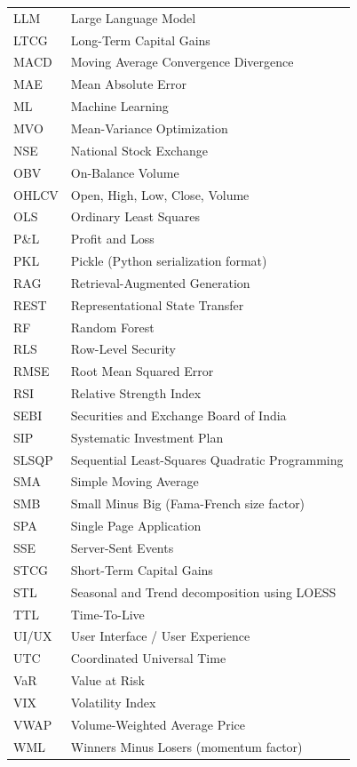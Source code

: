 \documentclass[12pt, a4paper, oneside]{report}
\begin{document}
\begin{longtable}{@{}l p{12cm}@{}}
LLM & Large Language Model \\
LTCG & Long-Term Capital Gains \\
MACD & Moving Average Convergence Divergence \\
MAE & Mean Absolute Error \\
ML & Machine Learning \\
MVO & Mean-Variance Optimization \\
NSE & National Stock Exchange \\
OBV & On-Balance Volume \\
OHLCV & Open, High, Low, Close, Volume \\
OLS & Ordinary Least Squares \\
P\&L & Profit and Loss \\
PKL & Pickle (Python serialization format) \\
RAG & Retrieval-Augmented Generation \\
REST & Representational State Transfer \\
RF & Random Forest \\
RLS & Row-Level Security \\
RMSE & Root Mean Squared Error \\
RSI & Relative Strength Index \\
SEBI & Securities and Exchange Board of India \\
SIP & Systematic Investment Plan \\
SLSQP & Sequential Least-Squares Quadratic Programming \\
SMA & Simple Moving Average \\
SMB & Small Minus Big (Fama-French size factor) \\
SPA & Single Page Application \\
SSE & Server-Sent Events \\
STCG & Short-Term Capital Gains \\
STL & Seasonal and Trend decomposition using LOESS \\
TTL & Time-To-Live \\
UI/UX & User Interface / User Experience \\
UTC & Coordinated Universal Time \\
VaR & Value at Risk \\
VIX & Volatility Index \\
VWAP & Volume-Weighted Average Price \\
WML & Winners Minus Losers (momentum factor) \\
\bottomrule
\end{longtable}
\end{document}
